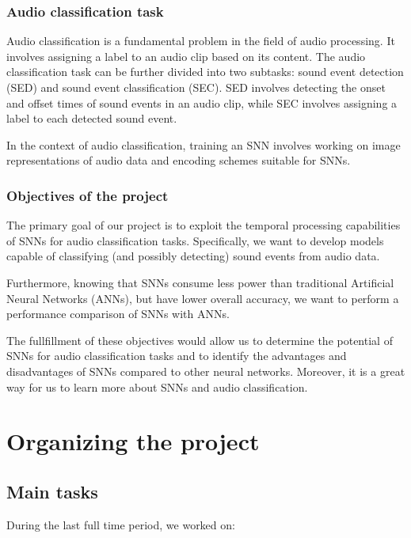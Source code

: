 \documentclass[11pt]{article}
\begin{document}
\subsubsection{Audio classification task}

Audio classification is a fundamental problem in the field of audio processing. It involves assigning a label to an audio clip based on its content. The audio classification task can be further divided into two subtasks: sound event detection (SED) and sound event classification (SEC). SED involves detecting the onset and offset times of sound events in an audio clip, while SEC involves assigning a label to each detected sound event.

In the context of audio classification, training an SNN involves working on image representations of audio data and encoding schemes suitable for SNNs.


\subsubsection{Objectives of the project}

The primary goal of our project is to exploit the temporal processing capabilities of SNNs for audio classification tasks. Specifically, we want to develop models capable of classifying (and possibly detecting) sound events from audio data.

Furthermore, knowing that SNNs consume less power than traditional Artificial Neural Networks (ANNs), but have lower overall accuracy, we want to perform a performance comparison of SNNs with ANNs.

The fullfillment of these objectives would allow us to determine the potential of SNNs for audio classification tasks and to identify the advantages and disadvantages of SNNs compared to other neural networks. Moreover, it is a great way for us to learn more about SNNs and audio classification.


\pagebreak

\section{Organizing the project}

\subsection{Main tasks}

During the last full time period, we worked on:
\end{document}
